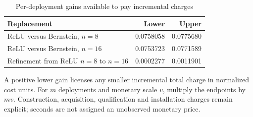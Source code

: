 \begin{table}[htbp]
\centering
\caption{Per-deployment gains available to pay incremental charges}\label{tab:fees78}
{\small\setlength{\tabcolsep}{4pt}
\begin{tabular}{lrr}
\hline
Replacement & Lower & Upper \\
\hline
ReLU versus Bernstein, $n=8$ & 0.0758058 & 0.0775680 \\
ReLU versus Bernstein, $n=16$ & 0.0753723 & 0.0771589 \\
Refinement from ReLU $n=8$ to $n=16$ & 0.0002277 & 0.0011901 \\
\hline
\end{tabular}}
\par\smallskip
{\footnotesize A positive lower gain licenses any smaller incremental total charge in normalized cost units. For $m$ deployments and monetary scale $v$, multiply the endpoints by $mv$. Construction, acquisition, qualification and installation charges remain explicit; seconds are not assigned an unobserved monetary price.}
\end{table}
